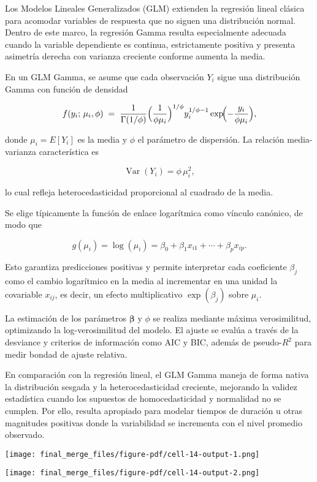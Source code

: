 \documentclass[
  letterpaper,
  DIV=11,
  numbers=noendperiod]{scrartcl}
\begin{document}
Los Modelos Lineales Generalizados (GLM) extienden la regresión lineal
clásica para acomodar variables de respuesta que no siguen una
distribución normal. Dentro de este marco, la regresión Gamma resulta
especialmente adecuada cuando la variable dependiente es continua,
estrictamente positiva y presenta asimetría derecha con varianza
creciente conforme aumenta la media.

En un GLM Gamma, se asume que cada observación \(Y_i\) sigue una
distribución Gamma con función de densidad

\[
f(y_i;\,\mu_i,\phi) \;=\; \frac{1}{\Gamma(1/\phi)}\Bigl(\frac{1}{\phi \mu_i}\Bigr)^{1/\phi} y_i^{1/\phi -1} \exp\!\Bigl(-\frac{y_i}{\phi \mu_i}\Bigr),
\]

donde \(\mu_i = E[Y_i]\) es la media y \(\phi\) el parámetro de
dispersión. La relación media-varianza característica es

\[
\operatorname{Var}(Y_i) = \phi\,\mu_i^2,
\]

lo cual refleja heterocedasticidad proporcional al cuadrado de la media.

Se elige típicamente la función de enlace logarítmica como vínculo
canónico, de modo que

\[
g(\mu_i) = \log(\mu_i) = \beta_0 + \beta_1 x_{i1} + \cdots + \beta_p x_{ip}.
\]

Esto garantiza predicciones positivas y permite interpretar cada
coeficiente \(\beta_j\) como el cambio logarítmico en la media al
incrementar en una unidad la covariable \(x_{ij}\), es decir, un efecto
multiplicativo \(\exp(\beta_j)\) sobre \(\mu_i\).

La estimación de los parámetros \(\boldsymbol{\beta}\) y \(\phi\) se
realiza mediante máxima verosimilitud, optimizando la log-verosimilitud
del modelo. El ajuste se evalúa a través de la desviance y criterios de
información como AIC y BIC, además de pseudo-\(R^2\) para medir bondad
de ajuste relativa.

En comparación con la regresión lineal, el GLM Gamma maneja de forma
nativa la distribución sesgada y la heterocedasticidad creciente,
mejorando la validez estadística cuando los supuestos de
homocedasticidad y normalidad no se cumplen. Por ello, resulta apropiado
para modelar tiempos de duración u otras magnitudes positivas donde la
variabilidad se incrementa con el nivel promedio observado.

\texttt{[image: final\_merge\_files/figure-pdf/cell-14-output-1.png]}

\texttt{[image: final\_merge\_files/figure-pdf/cell-14-output-2.png]}
\end{document}
